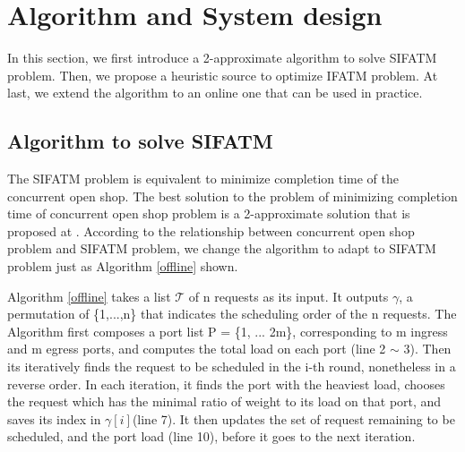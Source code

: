 \documentclass{IEEEtran}
\begin{document}
\section{Algorithm and System design} \label{system}
In this section, we first introduce a 2-approximate algorithm to solve SIFATM problem.
Then, we propose a heuristic source to optimize IFATM problem.
At last, we extend the algorithm to an online one that can be used in practice.

\subsection{Algorithm to solve SIFATM}
The SIFATM problem is equivalent to minimize completion time of the concurrent open shop.
The best solution to the problem of minimizing completion time of concurrent open shop problem is a 2-approximate solution that is proposed at
\cite{mastrolilli2010minimizing}.
According to the relationship between concurrent open shop problem and SIFATM
problem, we change the algorithm to adapt to SIFATM problem just as Algorithm \ref{offline} shown.


Algorithm \ref{offline} takes a list $\mathcal{T}$ of n requests as its input.
 It outputs $\gamma$, a permutation of \{1,...,n\} that indicates the scheduling order of the n requests.
The Algorithm first composes a port list P = \{1, ... 2m\}, corresponding to m ingress and m egress ports, 
 and computes the total load on each port (line 2 $\sim$ 3). 
 Then its iteratively finds the request to be scheduled in the i-th round, nonetheless in a reverse order. 
 In each iteration, it finds the port  with the heaviest load, chooses the request which has the minimal ratio of weight to its load on that port, and saves its index in $\gamma[i] $(line 7). 
 It then updates the set of request remaining to be scheduled, and the port load (line 10), before it goes to the next iteration.
\end{document}
